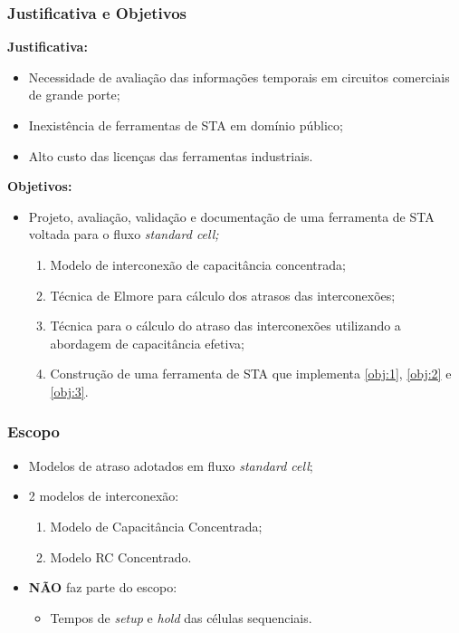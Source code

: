 \documentclass[10pt,a4paper]{beamer}
\begin{document}
			\begin{frame}[t]
				\frametitle{Justificativa e Objetivos}
				\textbf{Justificativa:}
				\begin{itemize}
					\item Necessidade de avaliação das informações temporais em circuitos comerciais de grande porte;
					\item Inexistência de ferramentas de STA em domínio público;
					\item Alto custo das licenças das ferramentas industriais.
				\end{itemize}
				
				\textbf{Objetivos:}
				\begin{itemize}
					\item Projeto, avaliação, validação e documentação de uma ferramenta de STA voltada para o fluxo \textit{standard cell;}
					\begin{enumerate}
						\item Modelo de interconexão de capacitância concentrada; \label{obj:1}
						\item Técnica de Elmore para cálculo dos atrasos das interconexões; \label{obj:2}
						\item Técnica para o cálculo do atraso das interconexões utilizando a abordagem de capacitância efetiva; \label{obj:3}
						\item Construção de uma ferramenta de STA que implementa \ref{obj:1}, \ref{obj:2} e \ref{obj:3}. 
					\end{enumerate}
				\end{itemize}
			\end{frame}
		
			
			\begin{frame}[t]
				\frametitle{Escopo}
				\begin{itemize}
					\item Modelos de atraso adotados em fluxo \textit{standard cell};
					\item 2 modelos de interconexão:
						\begin{enumerate}
							\item Modelo de Capacitância Concentrada;
							\item Modelo RC Concentrado.
						\end{enumerate}
					\item \textbf{NÃO} faz parte do escopo:
					\begin{itemize}
						\item Tempos de \textit{setup} e \textit{hold} das células sequenciais.
					\end{itemize}
				\end{itemize}
				
				
			\end{frame}
		
\end{document}

